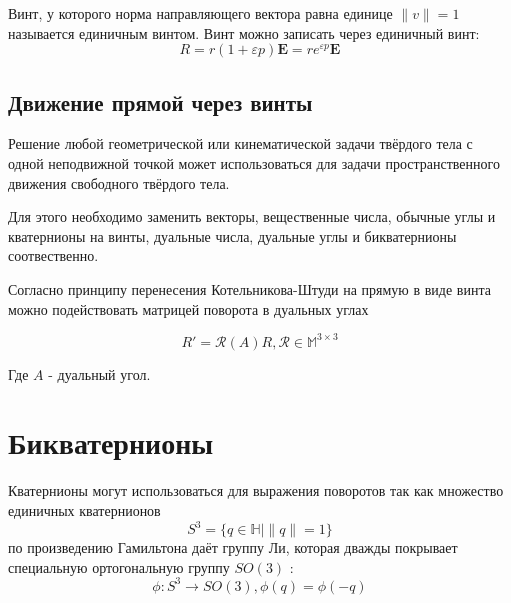   Винт, у которого норма направляющего вектора равна единице $\| v \| = 1$ называется единичным винтом. Винт можно записать через единичный винт:
  \begin{equation*}
    R = r(1+\varepsilon p)\mathbf{E} = r e^{\varepsilon p}\mathbf{E}
  \end{equation*}

  \subsection{Движение прямой через винты}
  
  \begin{theo}%
  \label{theo:one}  

    Решение любой геометрической или кинематической задачи твёрдого тела с одной неподвижной точкой может использоваться для задачи пространственного движения 
    свободного твёрдого тела.

    Для этого необходимо заменить векторы, вещественные числа, обычные углы и кватернионы на винты, дуальные числа, дуальные углы и бикватернионы соотвественно. 
  \end{theo}

  Согласно принципу перенесения Котельникова-Штуди на прямую в виде винта можно подействовать матрицей поворота в дуальных углах
  
  \begin{equation*}
    R' = \mathcal{R}(A) R, \mathcal{R} \in \mathbb{M}^{3 \times 3}
  \end{equation*}

  Где $A$ - дуальный угол. 

  \section{Бикватернионы}

  Кватернионы могут использоваться для выражения поворотов \autocite[Гл. N]{chelnokov2006кватернионные} так как множество единичных кватернионов 
  \begin{equation*}
    S^3 = \{q \in \mathbb{H} \mid \|q\| =1\}
  \end{equation*}
  по произведению Гамильтона даёт группу Ли, которая дважды покрывает специальную ортогональную группу $SO(3)$ \autocite[Гл. 12]{altmann1986rotations}:
  \begin{equation*}
    \phi : S^3 \rightarrow SO(3), \phi(q) = \phi(-q)
  \end{equation*}

